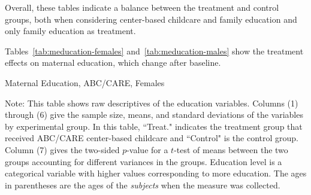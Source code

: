 















\noindent Overall, these tables indicate a balance between the treatment and control groups, both when considering center-based childcare and family education and only family education as treatment.

Tables~\ref{tab:meducation-females} and~\ref{tab:meducation-males} show the treatment effects on maternal education, which change after baseline.

\begin{table}[H]
\centering
\caption{Maternal Education, ABC/CARE, Females}
\label{tab:meducation-females}
\begin{threeparttable}

\begin{tablenotes}
\item Note: This table shows raw descriptives of the education variables. Columns (1) through (6) give the sample size, means, and standard deviations of the variables by experimental group. In this table, ``Treat." indicates the treatment group that received ABC/CARE center-based childcare and ``Control" is the control group. Column (7) gives the two-sided $p$-value for a $t$-test of means between the two groups accounting for different variances in the groups. Education level is a categorical variable with higher values corresponding to more education. The ages in parentheses are the ages of the \textit{subjects} when the measure was collected.
\end{tablenotes}
\end{threeparttable}
\end{table}

